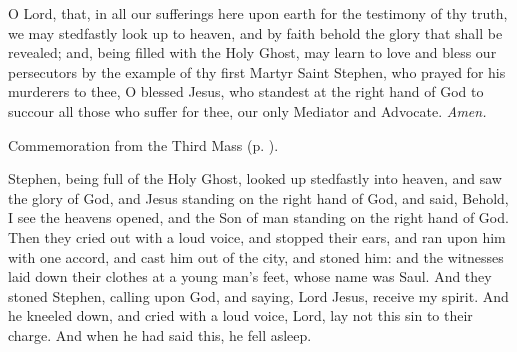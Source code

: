 \collect
{} O Lord, that, in all our sufferings here upon earth for the testimony of thy truth, we may stedfastly look up to heaven, and by faith behold the glory that shall be revealed; and, being filled with the Holy Ghost, may learn to love and bless our persecutors by the example of thy first Martyr Saint Stephen, who prayed for his murderers to thee, O blessed Jesus, who standest at the right hand of God to succour all those who suffer for thee, our only Mediator and Advocate. \textit{Amen.}
\begin{rubric}
    Commemoration  from the Third Mass (p. \pageref{NativityMassIIICollect}).
\end{rubric}

 Stephen, being full of the Holy Ghost, looked up stedfastly into heaven, and saw the glory of God, and Jesus standing on the right hand of God, and said, Behold, I see the heavens opened, and the Son of man standing on the right hand of God. Then they cried out with a loud voice, and stopped their ears, and ran upon him with one accord, and cast him out of the city, and stoned him: and the witnesses laid down their clothes at a young man’s feet, whose name was Saul. And they stoned Stephen, calling upon God, and saying, Lord Jesus, receive my spirit. And he kneeled down, and cried with a loud voice, Lord, lay not this sin to their charge. And when he had said this, he fell asleep.


